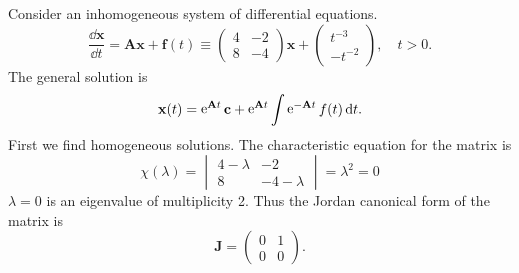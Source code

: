 \begin{Example}
  Consider an inhomogeneous system of differential equations.
  \[
  \frac{\dd \mathbf{x}}{\dd t} 
  = \mathbf{A} \mathbf{x} + \mathbf{f}(t)
  \equiv
  \begin{pmatrix}
    4 & -2 \\
    8 & -4
  \end{pmatrix}
  \mathbf{x} + 
  \begin{pmatrix}
    t^{-3} \\
    -t^{-2}
  \end{pmatrix},
  \quad t > 0.
  \]
  The general solution is 
  \[
  \mathbf{x}(t) = \mathop{\mathrm{e}}\nolimits^{\mathbf{A} t} \mathbf{c} + \mathop{\mathrm{e}}\nolimits^{\mathbf{A} t} \int \mathop{\mathrm{e}}\nolimits^{-\mathbf{A} t} f(t) \,\mathrm{d} t.
  \]
  First we find homogeneous solutions.  The characteristic equation for 
  the matrix is
  \[
  \chi(\lambda) = 
  \begin{vmatrix}
    4 - \lambda & -2 \\
    8 & -4 - \lambda
  \end{vmatrix} =
  \lambda^2 = 0
  \]
  $\lambda = 0$ is an eigenvalue of multiplicity 2.  
  Thus the Jordan canonical form of the matrix is 
  \[
  \mathbf{J} = \begin{pmatrix}
    0 & 1 \\
    0 & 0
  \end{pmatrix}.
  \]


\end{Example}
